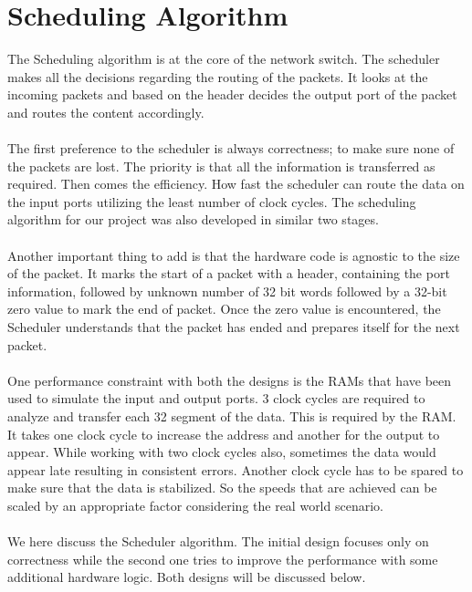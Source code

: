 \documentclass[twoside,12pt,fleqn]{book} %
\begin{document}
\section{Scheduling Algorithm}
The Scheduling algorithm is at the core of the network switch. The scheduler makes all the decisions regarding the routing of the packets. It looks at the incoming packets and based on the header decides the output port of the packet and routes the content accordingly.\\\\
The first preference to the scheduler is always correctness; to make sure none of the packets are lost. The priority is that all the information is transferred as required. Then comes the efficiency. How fast the scheduler can route the data on the input ports utilizing the least number of clock cycles. The scheduling algorithm for our project was also developed in similar two stages.\\\\
Another important thing to add is that the hardware code is agnostic to the size of the packet. It marks the start of a packet with a header, containing the port information, followed by unknown number of 32 bit words followed by a 32-bit zero value to mark the end of packet. Once the zero value is encountered, the Scheduler understands that the packet has ended and prepares itself for the next packet.\\\\
One performance constraint with both the designs is the RAMs that have been used to simulate the input and output ports. 3 clock cycles are required to analyze and transfer each 32 segment of the data. This is required by the RAM. It takes one clock cycle to increase the address and another for the output to appear. While working with two clock cycles also, sometimes the data would appear late resulting in consistent errors. Another clock cycle has to be spared to make sure that the data is stabilized. So the speeds that are achieved can be scaled by an appropriate factor considering the real world scenario.\\\\
We here discuss the Scheduler algorithm. The initial design focuses only on correctness while the second one tries to improve the performance with some additional hardware logic. Both designs will be discussed below.
\end{document}
